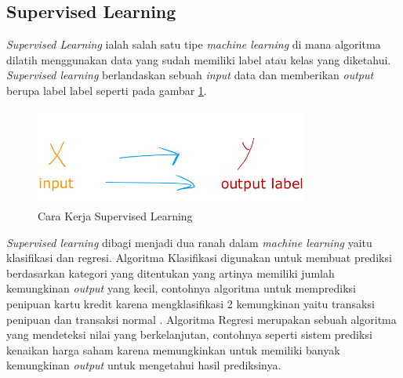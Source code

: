 \subsection{Supervised Learning} \label{II.Supervised Learning}
\textit{Supervised Learning} ialah salah satu tipe \textit{machine learning} di mana algoritma dilatih menggunakan data yang sudah memiliki label atau kelas yang diketahui. \textit{Supervised learning} berlandaskan sebuah \textit{input} data dan memberikan \textit{output} berupa label label seperti pada gambar \ref{fig:2.carasupervised}\cite{cunningham2008supervised}.
\begin{figure}[H] %
    \centering
    \includegraphics[width=0.8\textwidth]{figure/image.png}
    \caption{Cara Kerja Supervised Learning}
    \label{fig:2.carasupervised}
\end{figure}
\textit{Supervised learning} dibagi menjadi dua ranah dalam \textit{machine learning} yaitu klasifikasi dan regresi\cite{cunningham2008supervised}. Algoritma Klasifikasi digunakan untuk membuat prediksi berdasarkan kategori yang ditentukan yang artinya memiliki jumlah kemungkinan \textit{output} yang kecil, contohnya algoritma untuk memprediksi penipuan kartu kredit karena mengklasifikasi 2 kemungkinan yaitu transaksi penipuan dan transaksi normal \cite{cunningham2008supervised}. Algoritma Regresi merupakan sebuah algoritma yang mendeteksi nilai yang berkelanjutan, contohnya seperti sistem prediksi kenaikan harga saham karena memungkinkan untuk memiliki banyak kemungkinan \textit{output} untuk mengetahui hasil prediksinya\cite{cunningham2008supervised}. 


